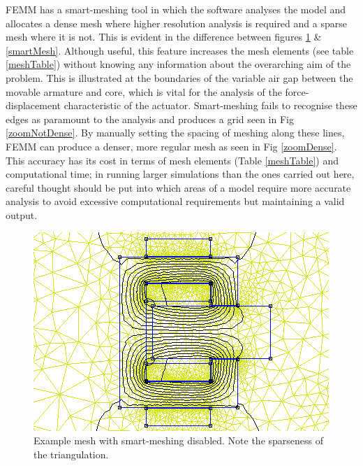 \documentclass[a4paper]{IEEEtran}
\begin{document}
    FEMM has a smart-meshing tool in which the software analyses the model and allocates a dense mesh where higher resolution analysis is required and a sparse mesh where it is not. This is evident in the difference between figures \ref{noSmartMesh} \& \ref{smartMesh}. Although useful, this feature increases the mesh elements (see table \ref{meshTable}) without knowing any information about the overarching aim of the problem. This is illustrated at the boundaries of the variable air gap between the movable armature and core, which is vital for the analysis of the force-displacement characteristic of the actuator. Smart-meshing fails to recognise these edges as paramount to the analysis and produces a grid seen in Fig \ref{zoomNotDense}. By manually setting the spacing of meshing along these lines, FEMM can produce a denser, more regular mesh as seen in Fig \ref{zoomDense}. This accuracy has its cost in terms of mesh elements (Table \ref{meshTable}) and computational time; in running larger simulations than the ones carried out here, careful thought should be put into which areas of a model require more accurate analysis to avoid excessive computational requirements but maintaining a valid output.

    \begin{figure}[ht]
        \includegraphics[width = \linewidth]{Smartmesh-OFF-NotDenseAirgap.png}
        \caption{Example mesh with smart-meshing disabled. Note the sparseness of the triangulation.}
        \label{noSmartMesh} 
    \end{figure}
\end{document}

